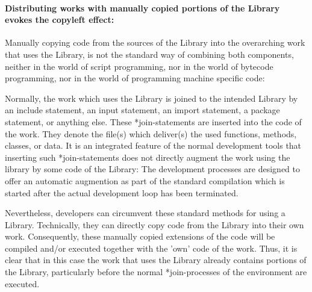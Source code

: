 \paragraph{Distributing works with manually copied portions of the Library
evokes the copyleft effect:}
\label{RevEngCopyCodeManually}
Manually copying code from the sources of the Library into the overarching
work that uses the Library, is not the standard way of combining both
components, neither in the world of script programming, nor in the world of
bytecode programming, nor in the world of programming machine specific code:

Normally, the work which uses the Library is joined to the intended Library by
an include statement, an input statement, an import statement, a package
statement, or anything else. These *join-statements are inserted into the code
of the work. They denote the file(s) which deliver(s) the used functions,
methods, classes, or data. It is an integrated feature of the normal development
tools that inserting such *join-statements does not directly augment the work
using the library by some code of the Library: The development processes are
designed to offer an automatic augmention as part of the standard compilation
which is started after the actual development loop has been terminated.

Nevertheless, developers can circumvent these standard methods for using a
Library. Technically, they can directly copy code from the Library into their
own work. Consequently, these manually copied extensions of the code will be
compiled and/or executed together with the 'own' code of the work. Thus, it is
clear that in this case the work that uses the Library already contains
portions of the Library, particularly before the normal *join-processes of the
environment are executed.

